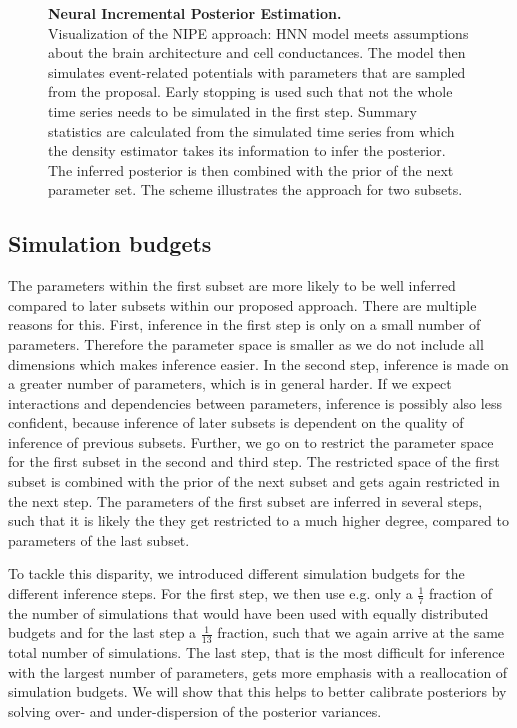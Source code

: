 \documentclass[12pt]{extreport}
\begin{document}
\begin{figure}
\label{fig:scheme}
  \centering

  
  \caption{\label{figure:scheme}\textbf{Neural Incremental Posterior Estimation.}\small \\ Visualization of the NIPE approach: HNN model meets assumptions about the brain architecture and cell conductances. The model then simulates event-related potentials with parameters that are sampled from the proposal. Early stopping is used such that not the whole time series needs to be simulated in the first step. Summary statistics are calculated from the simulated time series from which the density estimator takes its information to infer the posterior. The inferred posterior is then combined with the prior of the next parameter set. The scheme illustrates the approach for two subsets.}

\end{figure}



\subsection{Simulation budgets}
\label{sec:ratio}

The parameters within the first subset are more likely to be well inferred compared to later subsets within our proposed approach. There are multiple reasons for this. First, inference in the first step is only on a small number of parameters. Therefore the parameter space is smaller as we do not include all dimensions which makes inference easier. In the second step, inference is made on a greater number of parameters, which is in general harder. If we expect interactions and dependencies between parameters, inference is possibly also less confident, because inference of later subsets is dependent on the quality of inference of previous subsets. 
Further, we go on to restrict the parameter space for the first subset in the second and third step. The restricted space of the first subset is combined with the prior of the next subset and gets again restricted in the next step. The parameters of the first subset are inferred in several steps, such that it is likely the they get restricted to a much higher degree, compared to parameters of the last subset.

To tackle this disparity, we introduced different simulation budgets for the different inference steps. For the first step, we then use e.g. only a $\frac{1}{7}$ fraction of the number of simulations that would have been used with equally distributed budgets and for the last step a $\frac{1}{13} $ fraction, such that we again arrive at the same total number of simulations. The last step, that is the most difficult for inference with the largest number of parameters, gets more emphasis with a reallocation of simulation budgets.
We will show that this helps to better calibrate posteriors by solving over- and under-dispersion of the posterior variances.
\end{document}
